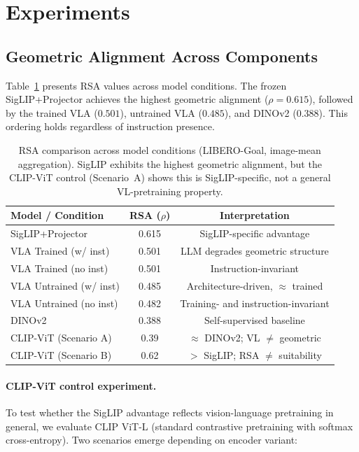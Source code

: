\documentclass[letterpaper]{article}
\begin{document}
\section{Experiments}
\label{sec:experiments}

\subsection{Geometric Alignment Across Components}
\label{sec:exp-rsa}

Table~\ref{tab:rsa-comparison} presents RSA values across model conditions. The frozen SigLIP+Projector achieves the highest geometric alignment ($\rho{=}0.615$), followed by the trained VLA ($0.501$), untrained VLA ($0.485$), and DINOv2 ($0.388$). This ordering holds regardless of instruction presence.

\begin{table}[t]
\centering
\caption{RSA comparison across model conditions (LIBERO-Goal, image-mean aggregation). SigLIP exhibits the highest geometric alignment, but the CLIP-ViT control (Scenario~A) shows this is SigLIP-specific, not a general VL-pretraining property.}
\label{tab:rsa-comparison}
\begin{tabular}{lcc}
\toprule
\textbf{Model / Condition} & \textbf{RSA ($\rho$)} & \textbf{Interpretation} \\
\midrule
SigLIP+Projector & 0.615 & SigLIP-specific advantage \\
VLA Trained (w/ inst) & 0.501 & LLM degrades geometric structure \\
VLA Trained (no inst) & 0.501 & Instruction-invariant \\
VLA Untrained (w/ inst) & 0.485 & Architecture-driven, $\approx$ trained \\
VLA Untrained (no inst) & 0.482 & Training- and instruction-invariant \\
DINOv2 & 0.388 & Self-supervised baseline \\
\midrule
CLIP-ViT (Scenario A) & 0.39 & $\approx$ DINOv2; VL $\neq$ geometric \\
CLIP-ViT (Scenario B) & 0.62 & $>$ SigLIP; RSA $\neq$ suitability \\
\bottomrule
\end{tabular}
\end{table}

\paragraph{CLIP-ViT control experiment.}
To test whether the SigLIP advantage reflects vision-language pretraining in general, we evaluate CLIP ViT-L (standard contrastive pretraining with softmax cross-entropy). Two scenarios emerge depending on encoder variant:
\end{document}
